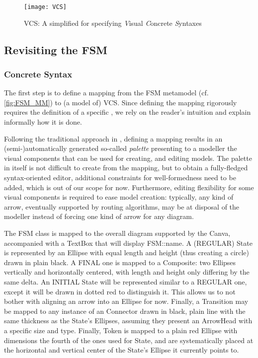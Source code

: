 \begin{figure}[t]%
   \centering
   \texttt{[image: VCS]}%
   \caption{\textsf{VCS}: A simplified \DSL for specifying \emph{V}isual \emph{C}oncrete \emph{S}yntaxes}%
   \label{fig:VCS}%
\end{figure}


\subsection{Revisiting the \textsf{FSM}}
\label{sec:Proposal-FSM}



\subsubsection{Concrete Syntax}
\label{sec:Proposal-FSM-CS}


The first step is to define a mapping from the \textsf{FSM} metamodel (cf. \autoref{fig:FSM_MM})
to (a model of) \textsf{VCS}. Since defining the mapping rigorously requires the
definition of a specific \DSL, we rely on the reader's intuition and explain 
informally how it is done.

Following the traditional approach in \MDE, defining a mapping results in an 
(semi-)automatically generated so-called \emph{palette} presenting to a modeller
the visual components that can be used for creating, and editing models. The palette
in itself is not difficult to create from the mapping, but to obtain a fully-fledged
syntax-oriented editor, additional constraints for well-formedness need to be added,
which is out of our scope for now. Furthermore, editing flexibility for some visual
components is required to ease model creation: typically, any kind of arrow, eventually
supported by routing algorithms, may be at disposal of the modeller instead of forcing
one kind of arrow for any diagram.

The \textsf{FSM} class is mapped to the overall diagram supported by the \textsf{Canva},
accompanied with a \textsf{TextBox} that will display \textsf{FSM::name}.
A (\textsf{REGULAR}) \textsf{State} is represented by an \textsf{Ellipse} with equal \textsf{length}
and \textsf{height} (thus creating a circle) drawn in plain black. A \textsf{FINAL}
one is mapped to a \textsf{Composite}: two \textsf{Ellipse}s vertically and horizontally
centered, with \textsf{length} and \textsf{height} only differing by the same delta.
An \textsf{INITIAL} \textsf{State} will be represented similar to a \textsf{REGULAR}
one, except it will be drawn in dotted red to distinguish it. This allows us to not
bother with aligning an arrow into an \textsf{Ellipse} for now. Finally, a 
\textsf{Transition} may be mapped to any instance of an \textsf{Connector} drawn
in black, plain line with the same thickness as the \textsf{State}'s \textsf{Ellipse}s,
assuming they present an \textsf{ArrowHead} with a specific size and type. Finally,
\textsf{Token} is mapped to a plain red \textsf{Ellipse} with dimensions the fourth
of the ones used for \textsf{State}, and are systematically placed at the horizontal
and vertical center of the \textsf{State}'s \textsf{Ellipse} it \textsf{current}ly
points to.

